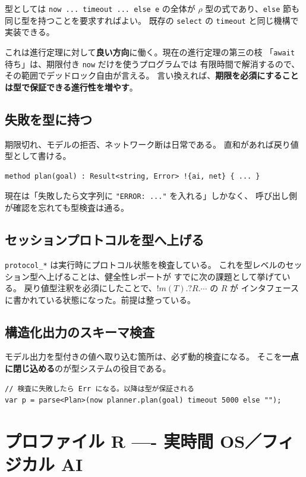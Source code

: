 \documentclass[11pt,a4paper]{ltjsarticle}
\theoremstyle{remark}
\begin{document}
型としては \texttt{now ... timeout ... else e} の全体が
$\rho$ 型の式であり、\texttt{else} 節も同じ型を持つことを要求すればよい。
既存の \texttt{select} の \texttt{timeout} と同じ機構で実装できる。

これは進行定理に対して\textbf{良い方向}に働く。現在の進行定理の第三の枝
「\texttt{await} 待ち」は、期限付き \texttt{now} だけを使うプログラムでは
有限時間で解消するので、その範囲でデッドロック自由が言える。
言い換えれば、\textbf{期限を必須にすることは型で保証できる進行性を増やす}。

\subsection{失敗を型に持つ}

期限切れ、モデルの拒否、ネットワーク断は日常である。
直和があれば戻り値型として書ける。

\begin{lstlisting}[language=AIPL]
method plan(goal) : Result<string, Error> !{ai, net} { ... }
\end{lstlisting}

現在は「失敗したら文字列に \texttt{"ERROR: ..."} を入れる」しかなく、
呼び出し側が確認を忘れても型検査は通る。

\subsection{セッションプロトコルを型へ上げる}

\texttt{protocol\_*} は実行時にプロトコル状態を検査している。
これを型レベルのセッション型へ上げることは、健全性レポートが
すでに次の課題として挙げている。
戻り値型注釈を必須にしたことで、$!m(T).?R.\cdots$ の $R$ が
インタフェースに書かれている状態になった。前提は整っている。

\subsection{構造化出力のスキーマ検査}

モデル出力を型付きの値へ取り込む箇所は、必ず動的検査になる。
そこを\textbf{一点に閉じ込める}のが型システムの役目である。

\begin{lstlisting}[language=AIPL]
// 検査に失敗したら Err になる。以降は型が保証される
var p = parse<Plan>(now planner.plan(goal) timeout 5000 else "");
\end{lstlisting}

\section{プロファイル R ---- 実時間 OS／フィジカル AI}
\end{document}
